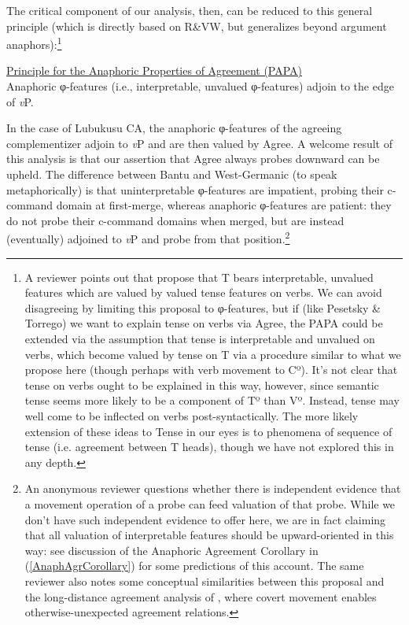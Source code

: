 \noindent The critical component of our analysis, then, can be reduced to this general principle (which is directly based on R\&VW, but generalizes beyond argument anaphors):\footnote{A reviewer points out that \citealt{Pesetsky:2007} propose that T bears interpretable, unvalued features which are valued by valued tense features on verbs. We can avoid disagreeing by limiting this proposal to φ-features, but if (like Pesetsky \& Torrego) we want to explain tense on verbs via Agree, the PAPA could be extended via the assumption that tense is interpretable and unvalued on verbs, which become valued by tense on T via a procedure similar to what we propose here (though perhaps with verb movement to Cº). It's not clear that tense on verbs ought to be explained in this way, however, since semantic tense seems more likely to be a component of Tº than Vº. Instead, tense may well come to be inflected on verbs post-syntactically. The more likely extension of these ideas to Tense in our eyes is to phenomena of sequence of tense (i.e. agreement between T heads), though we have not explored this in any depth.} 

\ea	\label{PAPA}
\underline{Principle for the Anaphoric Properties of Agreement  (PAPA)} \\
Anaphoric φ-features (i.e., interpretable, unvalued φ-features) adjoin to the edge of \textit{v}P.

\z

In the case of Lubukusu CA, the anaphoric φ-features of the agreeing complementizer adjoin to \textit{v}P and are then valued by Agree. A welcome result of this analysis is that our assertion that Agree always probes downward can be upheld. The difference between Bantu and West-Germanic (to speak metaphorically) is that uninterpretable φ-features are impatient, probing their c-command domain at first-merge, whereas anaphoric φ-features are patient: they do not probe their c-command domains when merged, but are instead (eventually) adjoined to \textit{v}P and probe from that position.\footnote{An anonymous reviewer questions whether there is independent evidence that a movement operation of a probe can feed valuation of that probe. While we don't have such independent evidence to offer here, we are in fact claiming that all valuation of interpretable features should be upward-oriented in this way: see discussion of the Anaphoric Agreement Corollary in (\ref{AnaphAgrCorollary}) for some predictions of this account. The same reviewer also notes some conceptual similarities between this proposal and the long-distance agreement analysis of \citet{Potsdam:2001}, where covert movement enables otherwise-unexpected agreement relations.}  

